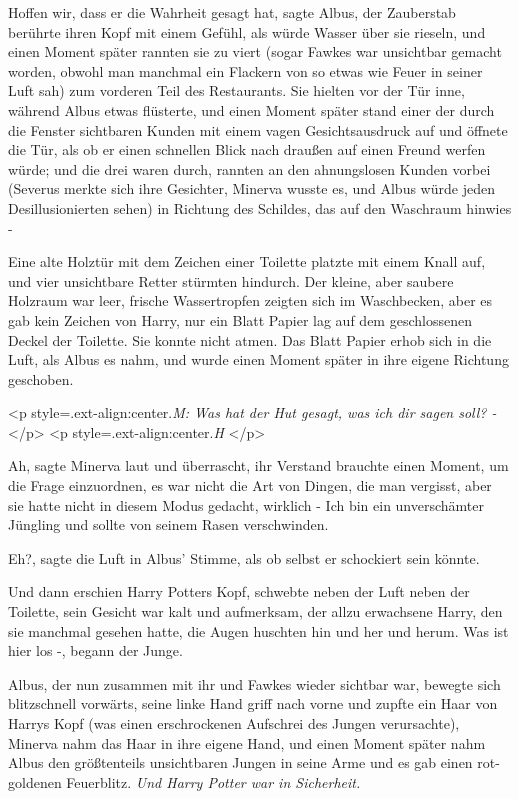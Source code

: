 \glqq Hoffen wir, dass er die Wahrheit gesagt hat\grqq{}, sagte Albus, der
Zauberstab berührte ihren Kopf mit einem Gefühl, als würde Wasser über sie
rieseln, und einen Moment später rannten sie zu viert (sogar Fawkes war
unsichtbar gemacht worden, obwohl man manchmal ein Flackern von so etwas wie
Feuer in seiner Luft sah) zum vorderen Teil des Restaurants. Sie hielten vor der
Tür inne, während Albus etwas flüsterte, und einen Moment später stand einer der
durch die Fenster sichtbaren Kunden mit einem vagen Gesichtsausdruck auf und
öffnete die Tür, als ob er einen schnellen Blick nach draußen auf einen Freund
werfen würde; und die drei waren durch, rannten an den ahnungslosen Kunden
vorbei (Severus merkte sich ihre Gesichter, Minerva wusste es, und Albus würde
jeden Desillusionierten sehen) in Richtung des Schildes, das auf den Waschraum
hinwies -

Eine alte Holztür mit dem Zeichen einer Toilette platzte mit einem Knall auf,
und vier unsichtbare Retter stürmten hindurch. Der kleine, aber saubere Holzraum
war leer, frische Wassertropfen zeigten sich im Waschbecken, aber es gab kein
Zeichen von Harry, nur ein Blatt Papier lag auf dem geschlossenen Deckel der
Toilette. Sie konnte nicht atmen. Das Blatt Papier erhob sich in die Luft, als
Albus es nahm, und wurde einen Moment später in ihre eigene Richtung geschoben.

<p style=\grqq{}.ext-align:center\grqq{}.\emph{M: Was hat der Hut gesagt, was
ich dir sagen soll? - }</p> <p style=\grqq{}.ext-align:center\grqq{}.\emph{H
}</p>

\glqq Ah\grqq{}, sagte Minerva laut und überrascht, ihr Verstand brauchte einen
Moment, um die Frage einzuordnen, es war nicht die Art von Dingen, die man
vergisst, aber sie hatte nicht in diesem Modus gedacht, wirklich - \glqq Ich bin
ein unverschämter Jüngling und sollte von seinem Rasen verschwinden.\grqq{}

\glqq Eh?\grqq{}, sagte die Luft in Albus' Stimme, als ob selbst er schockiert
sein könnte.

Und dann erschien Harry Potters Kopf, schwebte neben der Luft neben der
Toilette, sein Gesicht war kalt und aufmerksam, der allzu erwachsene Harry, den
sie manchmal gesehen hatte, die Augen huschten hin und her und herum. \glqq Was
ist hier los -\grqq{}, begann der Junge.

Albus, der nun zusammen mit ihr und Fawkes wieder sichtbar war, bewegte sich
blitzschnell vorwärts, seine linke Hand griff nach vorne und zupfte ein Haar von
Harrys Kopf (was einen erschrockenen Aufschrei des Jungen verursachte), Minerva
nahm das Haar in ihre eigene Hand, und einen Moment später nahm Albus den
größtenteils unsichtbaren Jungen in seine Arme und es gab einen rot-goldenen
Feuerblitz. \emph{Und Harry Potter war in Sicherheit.}

